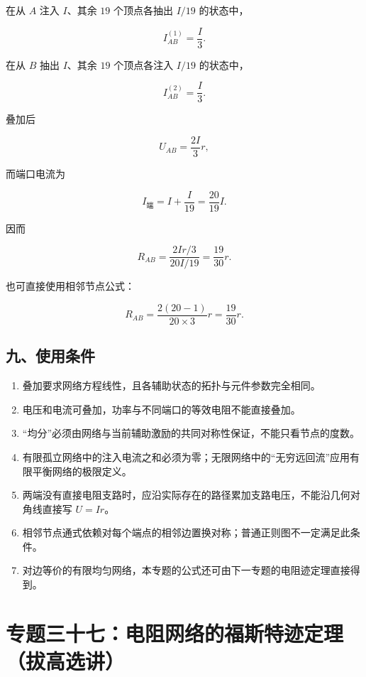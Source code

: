 在从 \(A\) 注入 \(I\)、其余 \(19\) 个顶点各抽出 \(I/19\) 的状态中，

\[
I_{AB}^{(1)}=\frac I3.
\]

在从 \(B\) 抽出 \(I\)、其余 \(19\) 个顶点各注入 \(I/19\) 的状态中，

\[
I_{AB}^{(2)}=\frac I3.
\]

叠加后

\[
U_{AB}=\frac{2I}{3}r,
\]

而端口电流为

\[
I_{\text{端}}=I+\frac I{19}=\frac{20}{19}I.
\]

因而

\[
\boxed{
R_{AB}=\frac{2Ir/3}{20I/19}=\frac{19}{30}r
}.
\]

也可直接使用相邻节点公式：

\[
R_{AB}=\frac{2(20-1)}{20\times3}r=\frac{19}{30}r.
\]

\subsection{九、使用条件}\label{m4:ux4e5dux4f7fux7528ux6761ux4ef6-1}

\begin{enumerate}
\def\labelenumi{\arabic{enumi}.}
\tightlist
\item
  叠加要求网络方程线性，且各辅助状态的拓扑与元件参数完全相同。
\item
  电压和电流可叠加，功率与不同端口的等效电阻不能直接叠加。
\item
  ``均分''必须由网络与当前辅助激励的共同对称性保证，不能只看节点的度数。
\item
  有限孤立网络中的注入电流之和必须为零；无限网络中的``无穷远回流''应用有限平衡网络的极限定义。
\item
  两端没有直接电阻支路时，应沿实际存在的路径累加支路电压，不能沿几何对角线直接写
  \(U=Ir\)。
\item
  相邻节点通式依赖对每个端点的相邻边置换对称；普通正则图不一定满足此条件。
\item
  对边等价的有限均匀网络，本专题的公式还可由下一专题的电阻迹定理直接得到。
\end{enumerate}

\section{专题三十七：电阻网络的福斯特迹定理（拔高选讲）}\label{m4:ux4e13ux9898ux4e09ux5341ux4e03ux7535ux963bux7f51ux7edcux7684ux798fux65afux7279ux8ff9ux5b9aux7406ux62d4ux9ad8ux9009ux8bb2}

